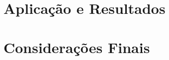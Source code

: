 \documentclass{./public/ufpatccdoisautores}
\begin{document}
\chapter{Aplicação e Resultados}


\chapter{Considerações Finais}
%

\renewcommand\bibname{Referências Bibliográficas}



\clearpage

\end{document}
